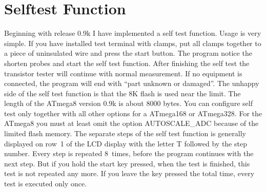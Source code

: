 
\section{Selftest Function}
\label{sec:selftest}
Beginning with release 0.9k I have implemented a self test function. Usage is very simple.
If you have installed  test terminal with clamps, put all clamps together to a piece of uninsulated wire and press the start button.
The program notice the shorten probes and start the self test function.
After finishing the self test the transistor tester will continue with normal measurement.
If no equipment is connected, the program will end with ``part unknown or damaged''. 
The unhappy side of the self test function is that the 8K flash is used near the limit.
The length of the ATmega8 version 0.9k is about 8000 bytes.
You can configure self test only together with all other options for a ATmega168  or ATmega328.
For the ATmega8 you must at least omit the option AUTOSCALE\_ADC because of the limited flash memory.
The separate steps of the self test function is generally displayed on row~1 of the LCD display with the letter T
followed by the step number.
Every step is repeated 8~times, before the program continues with the next step.
But if you hold the start key pressed, when the test is finished, this test is not repeated any more.
If you leave the key pressed the total time, every test is executed only once.

